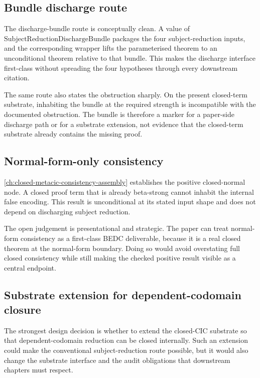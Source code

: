 \subsection{Bundle discharge route}
\label{subsec:metacic-open-problems-bundle}

The discharge-bundle route is conceptually clean. A value of
$\mathrm{SubjectReductionDischargeBundle}$ packages the four subject-reduction
inputs, and the corresponding wrapper lifts the parameterised theorem to an
unconditional theorem relative to that bundle. This makes the discharge
interface first-class without spreading the four hypotheses through every
downstream citation.

The same route also states the obstruction sharply. On the present closed-term
substrate, inhabiting the bundle at the required strength is incompatible with
the documented obstruction. The bundle is therefore a marker for a
paper-side discharge path or for a substrate extension, not evidence that the
closed-term substrate already contains the missing proof.

\subsection{Normal-form-only consistency}
\label{subsec:metacic-open-problems-normal-form-consistency}

\autoref{ch:closed-metacic-consistency-assembly} establishes the positive
closed-normal node. A closed proof term that is already beta-strong cannot
inhabit the internal false encoding. This result is unconditional at its
stated input shape and does not depend on discharging subject reduction.

The open judgement is presentational and strategic. The paper can treat
normal-form consistency as a first-class BEDC deliverable, because it is a real
closed theorem at the normal-form boundary. Doing so would avoid overstating
full closed consistency while still making the checked positive result visible
as a central endpoint.

\subsection{Substrate extension for dependent-codomain closure}
\label{subsec:metacic-open-problems-substrate-extension}

The strongest design decision is whether to extend the closed-CIC substrate so
that dependent-codomain reduction can be closed internally. Such an extension
could make the conventional subject-reduction route possible, but it would also
change the substrate interface and the audit obligations that downstream
chapters must respect.

